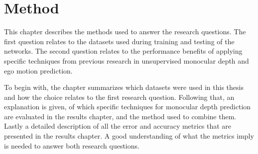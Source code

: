 \chapter{Method}\label{cha:method}

This chapter describes the methods used to answer the research questions. The first question relates to the datasets used during training and testing of the networks. The second question relates to the performance benefits of applying specific techniques from previous research in unsupervised monocular depth and ego motion prediction.

To begin with, the chapter summarizes which datasets were used in this thesis and how the choice relates to the first research question. Following that, an explanation is given, of which specific techniques for monocular depth prediction are evaluated in the results chapter, and the method used to combine them. Lastly a detailed description of all the error and accuracy metrics that are presented in the results chapter. A good understanding of what the metrics imply is needed to answer both research questions.






